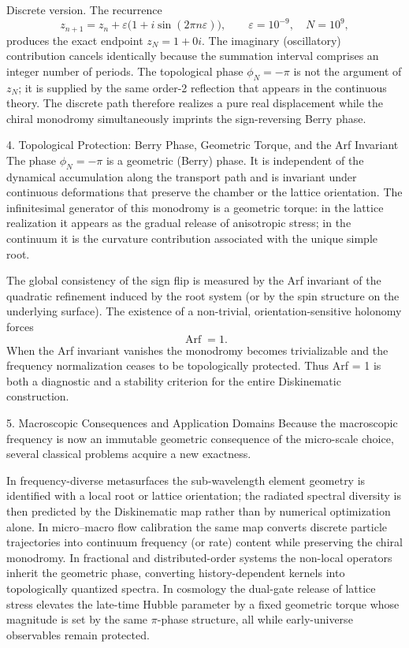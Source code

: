 Discrete version. The recurrence  
\[
z_{n+1}=z_n+\varepsilon\bigl(1+i\sin(2\pi n\varepsilon)\bigr),\qquad\varepsilon=10^{-9},\quad N=10^9,
\]  
produces the exact endpoint \(z_N=1+0i\). The imaginary (oscillatory) contribution cancels identically because the summation interval comprises an integer number of periods. The topological phase \(\phi_N=-\pi\) is not the argument of \(z_N\); it is supplied by the same order-2 reflection that appears in the continuous theory. The discrete path therefore realizes a pure real displacement while the chiral monodromy simultaneously imprints the sign-reversing Berry phase.

4. Topological Protection: Berry Phase, Geometric Torque, and the Arf Invariant
The phase \(\phi_N=-\pi\) is a geometric (Berry) phase. It is independent of the dynamical accumulation along the transport path and is invariant under continuous deformations that preserve the chamber or the lattice orientation. The infinitesimal generator of this monodromy is a geometric torque: in the lattice realization it appears as the gradual release of anisotropic stress; in the continuum it is the curvature contribution associated with the unique simple root.

The global consistency of the sign flip is measured by the Arf invariant of the quadratic refinement induced by the root system (or by the spin structure on the underlying surface). The existence of a non-trivial, orientation-sensitive holonomy forces  
\[
\operatorname{Arf}=1.
\]  
When the Arf invariant vanishes the monodromy becomes trivializable and the frequency normalization ceases to be topologically protected. Thus Arf = 1 is both a diagnostic and a stability criterion for the entire Diskinematic construction.

5. Macroscopic Consequences and Application Domains
Because the macroscopic frequency is now an immutable geometric consequence of the micro-scale choice, several classical problems acquire a new exactness.

In frequency-diverse metasurfaces the sub-wavelength element geometry is identified with a local root or lattice orientation; the radiated spectral diversity is then predicted by the Diskinematic map rather than by numerical optimization alone.  
In micro–macro flow calibration the same map converts discrete particle trajectories into continuum frequency (or rate) content while preserving the chiral monodromy.  
In fractional and distributed-order systems the non-local operators inherit the geometric phase, converting history-dependent kernels into topologically quantized spectra.  
In cosmology the dual-gate release of lattice stress elevates the late-time Hubble parameter by a fixed geometric torque whose magnitude is set by the same \(\pi\)-phase structure, all while early-universe observables remain protected.

